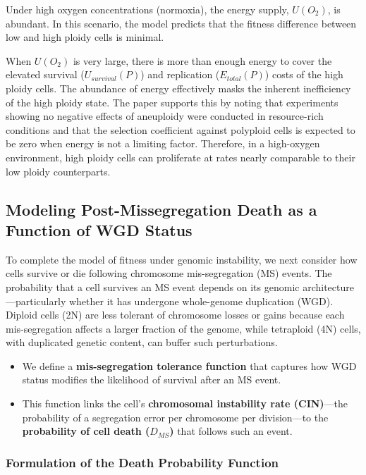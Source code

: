 \documentclass{article}
\begin{document}
Under high oxygen concentrations (normoxia), the energy supply, $U(O_2)$, is abundant. In this scenario, the model predicts that the fitness difference between low and high ploidy cells is minimal.

When $U(O_2)$ is very large, there is more than enough energy to cover the elevated survival ($U_{survival}(P)$) and replication ($E_{total}(P)$) costs of the high ploidy cells. The abundance of energy effectively masks the inherent inefficiency of the high ploidy state. The paper supports this by noting that experiments showing no negative effects of aneuploidy were conducted in resource-rich conditions and that the selection coefficient against polyploid cells is expected to be zero when energy is not a limiting factor. Therefore, in a high-oxygen environment, high ploidy cells can proliferate at rates nearly comparable to their low ploidy counterparts.



\subsection{Modeling Post-Missegregation Death as a Function of WGD Status}
To complete the model of fitness under genomic instability, we next consider how cells survive or die following chromosome mis-segregation (MS) events. The probability that a cell survives an MS event depends on its genomic architecture—particularly whether it has undergone whole-genome duplication (WGD). Diploid cells (2N) are less tolerant of chromosome losses or gains because each mis-segregation affects a larger fraction of the genome, while tetraploid (4N) cells, with duplicated genetic content, can buffer such perturbations.

\begin{itemize}
    \item We define a \textbf{mis-segregation tolerance function} that captures how WGD status modifies the likelihood of survival after an MS event.
    \item This function links the cell’s \textbf{chromosomal instability rate (CIN)}—the probability of a segregation error per chromosome per division—to the \textbf{probability of cell death ($D_{MS}$)} that follows such an event.
\end{itemize}

\subsubsection*{Formulation of the Death Probability Function}
\end{document}

